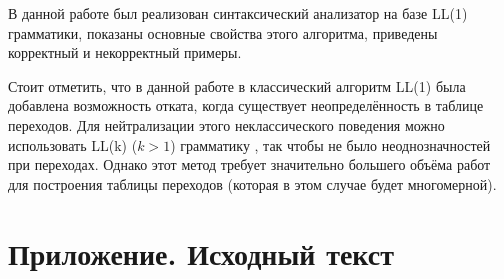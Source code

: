 \documentclass[a4paper,10pt,notitlepage,pdftex]{scrreprt}
\begin{document}
    В данной работе был реализован синтаксический анализатор на базе LL(1) грамматики, показаны основные свойства
    этого алгоритма, приведены корректный и некорректный примеры.

    Стоит отметить, что в данной работе в классический алгоритм LL(1) была добавлена возможность отката, когда
    существует неопределённость в таблице переходов.
    Для нейтрализации этого неклассического поведения можно использовать LL(k) ($k > 1$) грамматику , так чтобы не
    было неоднозначностей при переходах.
    Однако этот метод требует значительно большего объёма работ для построения таблицы переходов (которая в этом
    случае будет многомерной).
\chapter*{Приложение. Исходный текст}
    \lstset{language=C++,basicstyle=\scriptsize}
    
\end{document}
